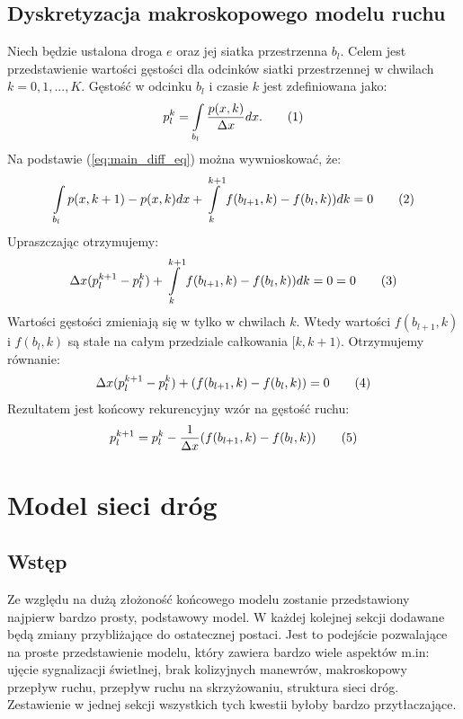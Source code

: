 \documentclass[12pt]{book}
\newcommand\addtag{\refstepcounter{equation}
\renewcommand{\labelenumii}{\theenumii}
\renewcommand{\theenumii}{\theenumi.\arabic{enumii}.}
\tag{\theequation}}
\begin{document}
\section{Dyskretyzacja makroskopowego modelu ruchu}
Niech będzie ustalona droga $e$ oraz jej siatka przestrzenna $b_l$. Celem jest przedstawienie wartości gęstości dla odcinków siatki przestrzennej w chwilach $k=0,1,...,K$.
Gęstość w odcinku $b_l$ i czasie $k$ jest zdefiniowana jako:
\[p_{l}^{k}=\int\limits_{{b_{l}}}{\frac{p(x,k)}{\Delta x}dx}. \addtag\]
Na podstawie (\ref{eq:main_diff_eq}) można wywnioskować, że:
\[\int\limits_{b_{l}} {p(x,k+1)- p(x,k)dx} +\int\limits_{k}^{k+1} f(b_{l+1},k)-f(b_{l},k))dk=0 \addtag \label{eq:calki-LWR} \]
Upraszczając otrzymujemy:
\[\Delta x(p_l^{k+1}-p_l^{k}) +\int\limits_{k}^{k+1} f(b_{l+1},k)-f(b_{l},k))dk=0=0 \addtag \]
Wartości gęstości zmieniają się w tylko w chwilach $k$. Wtedy wartości $f(b_{l+1},k)$ i $f(b_l,k)$ są stałe na całym przedziale całkowania $[k,k+1)$. Otrzymujemy równanie:
\[\Delta x(p_l^{k+1}-p_l^{k})  + (f(b_{l+1},k)-f(b_l,k))=0 \addtag \]
Rezultatem jest końcowy rekurencyjny wzór na gęstość ruchu:
\[p_l^{k+1}=p_l^{k}  -\frac{1}{\Delta x}  (f(b_{l+1},k)-f(b_l,k)) \addtag \]


\chapter{Model sieci dróg}
\section{Wstęp}
Ze względu na dużą złożoność końcowego modelu zostanie przedstawiony najpierw bardzo prosty, podstawowy model. W każdej kolejnej sekcji dodawane będą zmiany przybliżające do ostatecznej postaci. Jest to podejście pozwalające na proste przedstawienie modelu, który zawiera bardzo wiele aspektów m.in:
ujęcie sygnalizacji świetlnej, brak kolizyjnych manewrów, makroskopowy przepływ ruchu, przepływ ruchu na skrzyżowaniu, struktura sieci dróg. Zestawienie w jednej sekcji wszystkich tych kwestii byłoby bardzo przytłaczające.
\end{document}
